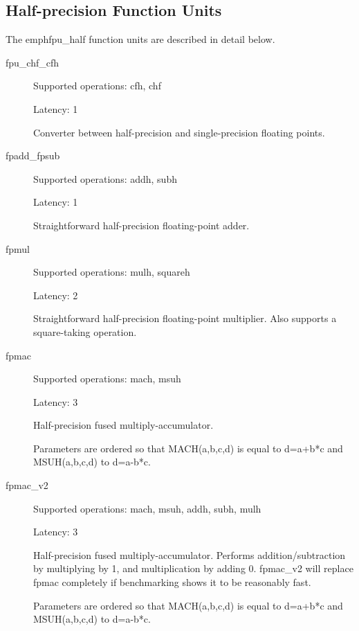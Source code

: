 \documentclass[twoside]{tceusermanual}
\begin{document}
\subsection{Half-precision Function Units}

The emph{fpu\_half} function units are described in detail below.

\begin{description}

\item[fpu\_chf\_cfh]

Supported operations: cfh, chf

Latency: 1

Converter between half-precision and single-precision floating points.

\item[fpadd\_fpsub]

Supported operations: addh, subh

Latency: 1

Straightforward half-precision floating-point adder.

\item[fpmul]

Supported operations:         mulh, squareh

Latency:             2

Straightforward half-precision floating-point multiplier. Also supports a square-taking operation.

\item[fpmac]

Supported operations:         mach, msuh

Latency:             3

Half-precision fused multiply-accumulator.

Parameters are ordered so that MACH(a,b,c,d) is equal to d=a+b*c and MSUH(a,b,c,d) to d=a-b*c.

\item[fpmac\_v2]

Supported operations:         mach, msuh, addh, subh, mulh

Latency:             3

Half-precision fused multiply-accumulator. Performs addition/subtraction by multiplying by 1,
and multiplication by adding 0. fpmac\_v2 will replace fpmac completely if benchmarking shows it
to be reasonably fast.

Parameters are ordered so that MACH(a,b,c,d) is equal to d=a+b*c and MSUH(a,b,c,d) to d=a-b*c.



\end{description}
\end{document}
